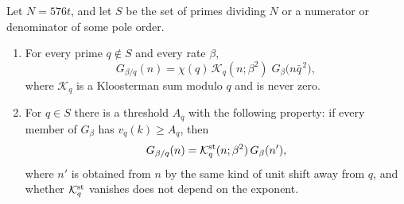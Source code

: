 \documentclass[11pt]{amsart}
\begin{document}
\begin{proposition}\label{prop:SL}
Let $N=576t$, and let $S$ be the set of primes dividing $N$ or a numerator or denominator of some pole order.
\begin{enumerate}[label=(\alph*),leftmargin=2em]
\item For every prime $q\notin S$ and every rate $\beta$,
\[
G_{\beta/q}(n)=\chi(q)\,\mathcal K_q(n;\beta^2)\;G_\beta\big(n\bar q^{\,2}\big),
\]
where $\mathcal K_q$ is a Kloosterman sum modulo $q$ and is never zero.
\item For $q\in S$ there is a threshold $A_q$ with the following property: if every member of $G_\beta$ has $v_q(k)\ge A_q$, then
\[
G_{\beta/q}(n)=\mathcal K^{\rm st}_q(n;\beta^2)\,G_\beta(n'),
\]
where $n'$ is obtained from $n$ by the same kind of unit shift away from $q$, and whether $\mathcal K^{\rm st}_q$ vanishes does not depend on the exponent.
\end{enumerate}
\end{proposition}
\end{document}
